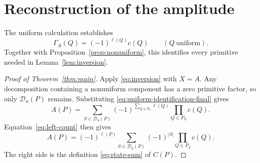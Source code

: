 \documentclass[11pt,letterpaper]{article}
\numberwithin{equation}{section}
\theoremstyle{definition}
\theoremstyle{remark}
\newcommand{\Dcal}{\mathcal D}
\begin{document}
\section{Reconstruction of the amplitude}
\label{sec:completion}

The uniform calculation establishes
\begin{equation}
 \Gamma_A(Q)=(-1)^{\ell(Q)}c(Q)
 \qquad(Q\ \text{uniform}).
 \label{eq:uniform-identification-final}
\end{equation}
Together with Proposition~\ref{prop:nonuniform}, this identifies every
primitive needed in Lemma~\ref{lem:inversion}.

\begin{proof}[Proof of Theorem~\ref{thm:main}]
Apply \eqref{eq:inversion} with \(X=A\). Any decomposition containing a
nonuniform component has a zero primitive factor, so only
\(\Dcal_{\mathrm u}(P)\) remains. Substituting
\eqref{eq:uniform-identification-final} gives
\begin{equation}
 A(P)=\sum_{S\in\Dcal_{\mathrm u}(P)}
       (-1)^{\sum_{Q\in P_S}\ell(Q)}\prod_{Q\in P_S}c(Q).
 \label{eq:reconstruction-before-sign}
\end{equation}
Equation~\eqref{eq:left-count} then gives
\begin{equation}
 A(P)=(-1)^{\ell(P)}
       \sum_{S\in\Dcal_{\mathrm u}(P)}(-1)^{|S|}
                         \prod_{Q\in P_S}c(Q).
 \label{eq:reconstruction-after-sign}
\end{equation}
The right side is the definition \eqref{eq:state-sum} of \(C(P)\).
\end{proof}
\end{document}
